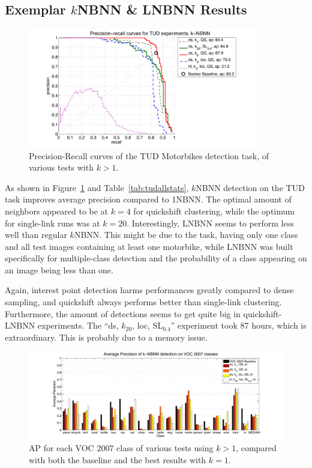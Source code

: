 
\subsection{Exemplar $k$NBNN \& LNBNN Results} %
\label{ssub:lnbnn_results}

\begin{figure}[hbt]
    \centering
    \includegraphics[width=0.9\textwidth]{TUDklocprc}
    \caption{Precision-Recall curves of the TUD Motorbikes detection task, of various tests with $k>1$.}
    \label{fig:tudklocprc}
\end{figure}



As shown in Figure~\ref{fig:tudklocprc} and Table~\ref{tab:tudallstats}, $k$NBNN detection on the TUD task improves average precision compared to 1NBNN. The optimal amount of neighbors appeared to be at $k=4$ for quickshift clustering, while the optimum for single-link runs was at $k=20$. Interestingly, LNBNN seems to perform less well than regular $k$NBNN. This might be due to the task, having only one class and all test images containing at least one motorbike, while LNBNN was built specifically for multiple-class detection and the probability of a class appearing on an image being less than one.

Again, interest point detection harms performances greatly compared to dense sampling, and quickshift always performs better than single-link clustering. Furthermore, the amount of detections seems to get quite big in quickshift-LNBNN experiments. The ``ds, $k_{20}$, loc, SL$_{0.4}$'' experiment took 87 hours, which is extraordinary. This is probably due to a memory issue.

\begin{figure}[hbt]
    \centering
    \includegraphics[width=\textwidth]{VOCklocap}
    \caption{AP for each VOC 2007 class of various tests using $k>1$, compared with both the baseline and the best results with $k=1$.}
    \label{fig:vocklocap}
\end{figure}



